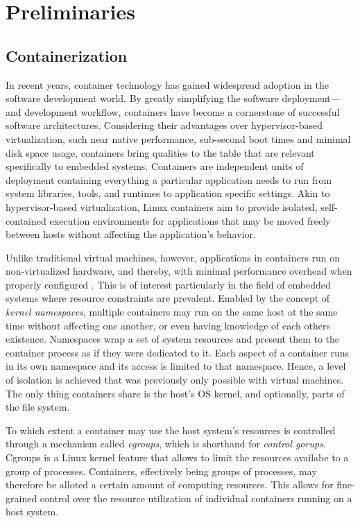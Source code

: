 
\section{Preliminaries}
\label{sec:preliminaries}


\subsection{Containerization}

In recent years, container technology has gained widespread adoption in the software development world. By greatly simplifying the software deployment—and development workflow, containers have become a cornerstone of successful software architectures.
Considering their advantages over hypervisor-based virtualization, such near native performance, sub-second boot times \cite{felter2015updated}\cite{morabito2015hypervisors} and minimal disk space usage, containers bring qualities to the table that are relevant specifically to embedded systems.
Containers are independent units of deployment containing everything a particular application needs to run from system libraries, tools, and runtimes to application specific settings. 
Akin to hypervisor-based virtualization, Linux containers aim to provide isolated, self-contained execution environments for applications that may be moved freely between hosts without affecting the application’s behavior.

Unlike traditional virtual machines, however, applications in containers run on non-virtualized hardware, and thereby, with minimal performance overhead when properly configured \cite{felter2015updated}\cite{morabito2015hypervisors}. This is of interest particularly in the field of embedded systems where resource constraints are prevalent.
Enabled by the concept of \emph{kernel namespaces}, multiple containers may run on the same host at the same time without affecting one another, or even having knowledge of each others existence. 
Namespaces wrap a set of system resources and present them to the container process as if they were dedicated to it. Each aspect of a container runs in its own namespace and its access is limited to that namespace. Hence, a level of isolation is achieved that was previously only possible with virtual machines. The only thing containers share is the host’s OS kernel, and optionally, parts of the file system.

To which extent a container may use the host system's resources is controlled through a mechanism called \emph{cgroups}, which is shorthand for \emph{control gorups}. 
Cgroups is a Linux kernel feature that allows to limit the resources availabe to a group of processes. Containers, effectively being groups of processes, may therefore be alloted a certain amount of computing resources. This allows for fine-grained control over the resource utilization of individual containers running on a host system.

